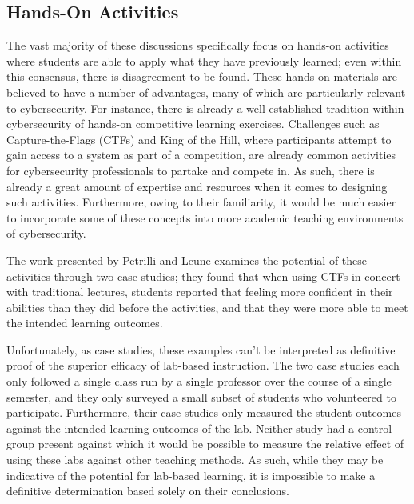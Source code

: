 \documentclass{article}
\begin{document}
\subsection{Hands-On Activities}

    The vast majority of these discussions specifically focus on hands-on activities where students are able to apply what they have previously learned; even within this consensus, there is disagreement to be found. 
    These hands-on materials are believed to have a number of advantages, many of which are particularly relevant to cybersecurity. For instance, there is already a well established tradition within cybersecurity of hands-on competitive learning exercises. 
    Challenges such as Capture-the-Flags (CTFs) and King of the Hill, where participants attempt to gain access to a system as part of a competition, are already common activities for cybersecurity professionals to partake and compete in. 
    As such, there is already a great amount of expertise and resources when it comes to designing such activities. 
    Furthermore, owing to their familiarity, it would be much easier to incorporate some of these concepts into more academic teaching environments of cybersecurity.

    The work presented by Petrilli and Leune examines the potential of these activities through two case studies; 
    they found that when using CTFs in concert with traditional lectures, students reported that feeling more confident in their abilities than they did before the activities, and that they were more able to meet the intended learning outcomes. 

    Unfortunately, as case studies, these examples can’t be interpreted as definitive proof of the superior efficacy of lab-based instruction. 
    The two case studies each only followed a single class run by a single professor over the course of a single semester, and they only surveyed a small subset of students who volunteered to participate. 
    Furthermore, their case studies only measured the student outcomes against the intended learning outcomes of the lab. 
    Neither study had a control group present against which it would be possible to measure the relative effect of using these labs against other teaching methods. 
    As such, while they may be indicative of the potential for lab-based learning, it is impossible to make a definitive determination based solely on their conclusions.
\end{document}
